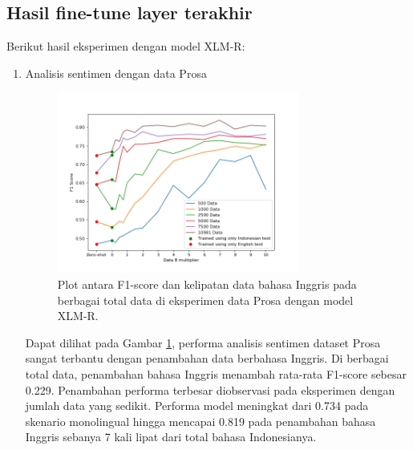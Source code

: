    \subsection{Hasil fine-tune layer terakhir}
        Berikut hasil eksperimen dengan model XLM-R: 
        \begin{enumerate}
            \item Analisis sentimen dengan data Prosa \\
            \begin{figure}[ht]
                \centering
                \includegraphics[width=0.75\textwidth]{resources/plot-head-prosa-xlmr.png}
                \caption{Plot antara F1-score dan kelipatan data bahasa Inggris pada berbagai total data di eksperimen data Prosa dengan model XLM-R.}
                \label{fig:plot_head_prosa_xlmr}
            \end{figure}
            Dapat dilihat pada Gambar \ref{fig:plot_head_prosa_xlmr}, performa analisis sentimen dataset Prosa sangat terbantu dengan penambahan data berbahasa Inggris. Di berbagai total data, penambahan bahasa Inggris menambah rata-rata F1-score sebesar 0.229. Penambahan performa terbesar diobservasi pada eksperimen dengan jumlah data yang sedikit. Performa model meningkat dari 0.734 pada skenario monolingual hingga mencapai 0.819 pada penambahan bahasa Inggris sebanya 7 kali lipat dari total bahasa Indonesianya.


\end{enumerate}
